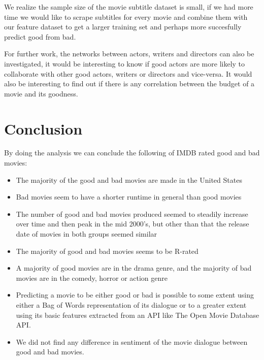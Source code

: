 \documentclass{acm_proc_article-sp}
\begin{document}
We realize the sample size of the movie subtitle dataset is small, if we had more time we would like to scrape subtitles for every movie and combine them with our feature dataset to get a larger training set and perhaps more succesfully predict good from bad.

For further work, the networks between actors, writers and directors can also be investigated, it would be interesting to know if good actors are more likely to collaborate with other good actors, writers or directors and vice-versa.
It would also be interesting to find out if there is any correlation between the budget of a movie and its goodness.

\section{Conclusion}

By doing the analysis we can conclude the following of IMDB rated good and bad movies:
\begin{itemize}
\item The majority of the good and bad movies are made in the United States
\item Bad movies seem to have a shorter runtime in general than good movies
\item The number of good and bad movies produced seemed to steadily increase over time and then peak in the mid 2000's, but other than that the release date of movies in both groups seemed similar
\item The majority of good and bad movies seems to be R-rated
\item A majority of good movies are in the drama genre, and the majority of bad movies are in the comedy, horror or action genre
\item Predicting a movie to be either good or bad is possible to some extent using either a Bag of Words representation of its dialogue or to a greater extent using its basic features extracted from an API like The Open Movie Database API.
\item We did not find any difference in sentiment of the movie dialogue between good and bad movies.
\end{itemize}
\end{document}
